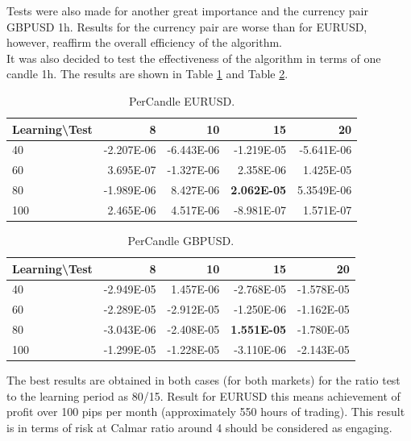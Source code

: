 \documentclass[runningheads,a4paper]{llncs}
\begin{document}
Tests were also made for another great importance and the currency pair GBPUSD 1h. Results for the currency pair are worse than for EURUSD, however, reaffirm the overall efficiency of the algorithm.\\

It was also decided to test the effectiveness of the algorithm in terms of one candle 1h. The results are shown in Table \ref{tab:tab3} and Table \ref{tab:tab4}.

\begin{table}[h!]
\centering
\caption{PerCandle EURUSD.}
\label{tab:tab3}
\begin{tabular}{|l|r|r|r|r|} \hline
Learning\textbackslash Test &	8	 &	10 &		15	 &	20\\ \hline
40 &		-2.207E-06 &		-6.443E-06 &		-1.219E-05 &		-5.641E-06\\ \hline
60 &		3.695E-07 &		-1.327E-06 &		2.358E-06 &		1.425E-05\\ \hline
80 &		-1.989E-06 &		8.427E-06	 &	\textbf{2.062E-05} &		5.3549E-06\\ \hline
100	 &	2.465E-06 &		4.517E-06 &		-8.981E-07 &		1.571E-07\\ \hline
\end{tabular}
\end{table}
\FloatBarrier

\begin{table}[h!]
\centering
\caption{PerCandle GBPUSD.}
\label{tab:tab4}
\begin{tabular}{|l|r|r|r|r|} \hline
Learning\textbackslash Test &	8	 & 	10 &		15	 &	20\\ \hline
40	 & -2.949E-05 & 	1.457E-06 & 	-2.768E-05	 & -1.578E-05\\ \hline
60	 & -2.289E-05 & 	-2.912E-05 & 	-1.250E-06 & 	-1.162E-05\\ \hline
80	 & -3.043E-06 & 	-2.408E-05	 & \textbf{1.551E-05} & 	-1.780E-05\\ \hline
100	 & -1.299E-05 & 	-1.228E-05 & 	-3.110E-06	 & -2.143E-05\\ \hline
\end{tabular}
\end{table}
\FloatBarrier


The best results are obtained in both cases (for both markets) for the ratio test to the learning period as 80/15. Result for EURUSD this means achievement of profit over 100 pips per month (approximately 550 hours of trading). This result is in terms of risk at Calmar ratio around 4 should be considered as engaging.\\
\end{document}
